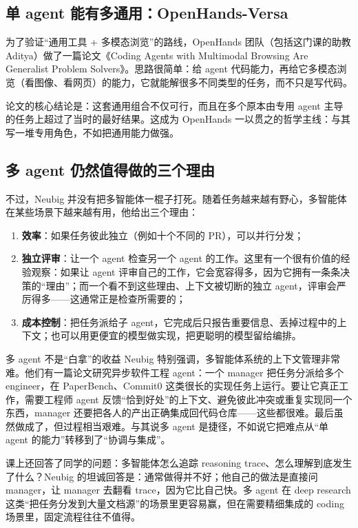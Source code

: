 \documentclass[a4paper]{article}
\begin{document}
\subsection{单 agent 能有多通用：OpenHands-Versa}

为了验证“通用工具 + 多模态浏览”的路线，OpenHands 团队（包括这门课的助教 Aditya）做了一篇论文《Coding Agents with Multimodal Browsing Are Generalist Problem Solvers》。思路很简单：给 agent 代码能力，再给它多模态浏览（看图像、看网页）的能力，它就能解很多不同类型的任务，而不只是写代码。

论文的核心结论是：这套通用组合不仅可行，而且在多个原本由专用 agent 主导的任务上超过了当时的最好结果。这成为 OpenHands 一以贯之的哲学主线：与其写一堆专用角色，不如把通用能力做强。

\subsection{多 agent 仍然值得做的三个理由}

不过，Neubig 并没有把多智能体一棍子打死。随着任务越来越有野心，多智能体在某些场景下越来越有用，他给出三个理由：

\begin{enumerate}
\item \textbf{效率}：如果任务彼此独立（例如十个不同的 PR），可以并行分发；
\item \textbf{独立评审}：让一个 agent 检查另一个 agent 的工作。这里有一个很有价值的经验观察：如果让 agent 评审自己的工作，它会宽容得多，因为它拥有一条条决策的“理由”；而一个看不到这些理由、上下文被切断的独立 agent，评审会严厉得多——这通常正是检查所需要的；
\item \textbf{成本控制}：把任务派给子 agent，它完成后只报告重要信息、丢掉过程中的上下文；也可以用更便宜的模型做实现，把更聪明的模型留给编排。
\end{enumerate}

\begin{warningbox}{多 agent 不是“白拿”的收益}
Neubig 特别强调，多智能体系统的上下文管理非常难。他们有一篇论文研究异步软件工程 agent：一个 manager 把任务分派给多个 engineer，在 PaperBench、Commit0 这类很长的实现任务上运行。要让它真正工作，需要工程师 agent 反馈“恰到好处”的上下文、避免彼此冲突或重复实现同一个东西，manager 还要把各人的产出正确集成回代码仓库——这些都很难。最后虽然做成了，但过程相当艰难。与其说多 agent 是捷径，不如说它把难点从“单 agent 的能力”转移到了“协调与集成”。
\end{warningbox}

课上还回答了同学的问题：多智能体怎么追踪 reasoning trace、怎么理解到底发生了什么？Neubig 的坦诚回答是：通常做得并不好；他自己的做法是直接问 manager，让 manager 去翻看 trace，因为它比自己快。多 agent 在 deep research 这类“把任务分发到大量文档源”的场景里更容易赢，但在需要精细集成的 coding 场景里，固定流程往往不值得。
\end{document}
